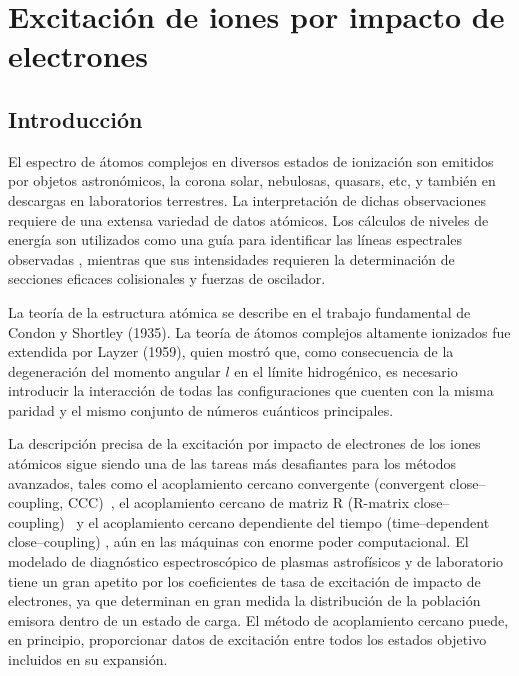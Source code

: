 \chapter{Excitación de iones por impacto de electrones}

\section{Introducción}
\label{sec:intro}

El espectro de átomos complejos en diversos estados de ionización son 
emitidos por objetos astronómicos, la corona solar, nebulosas, quasars, 
etc, y también en descargas en laboratorios terrestres. La interpretación
de dichas observaciones requiere de una extensa variedad de datos 
atómicos. Los cálculos de niveles de energía son utilizados como una guía
para identificar las líneas espectrales observadas , mientras que sus 
intensidades requieren la determinación de secciones eficaces 
colisionales y fuerzas de oscilador.

La teoría de la estructura atómica se describe en el trabajo fundamental
de Condon y Shortley (1935). La teoría de átomos complejos altamente 
ionizados fue extendida por Layzer (1959), quien mostró que, como 
consecuencia de la degeneración del momento angular $l$ en el límite 
hidrogénico, es necesario introducir la interacción de todas las 
configuraciones que cuenten con la misma paridad y el mismo conjunto de 
números cuánticos principales.

La descripción precisa de la excitación por impacto de electrones de los 
iones atómicos sigue siendo una de las tareas más desafiantes para los 
métodos avanzados, tales como el acoplamiento cercano convergente 
(convergent close--coupling, CCC)~\cite{Bray:92}, el acoplamiento cercano 
de matriz R (R-matrix close--coupling)~\cite{Burke:75} y el acoplamiento 
cercano dependiente del tiempo (time--dependent close--coupling) 
\cite{Pindzola:07}, aún en las máquinas con enorme poder computacional.
El modelado de diagnóstico espectroscópico de plasmas astrofísicos y de 
laboratorio tiene un gran apetito por los coeficientes de tasa de 
excitación de impacto de electrones, ya que determinan en gran medida la 
distribución de la población emisora dentro de un estado de carga. El 
método de acoplamiento cercano puede, en principio, proporcionar datos 
de excitación entre todos los estados objetivo incluidos en su expansión.



